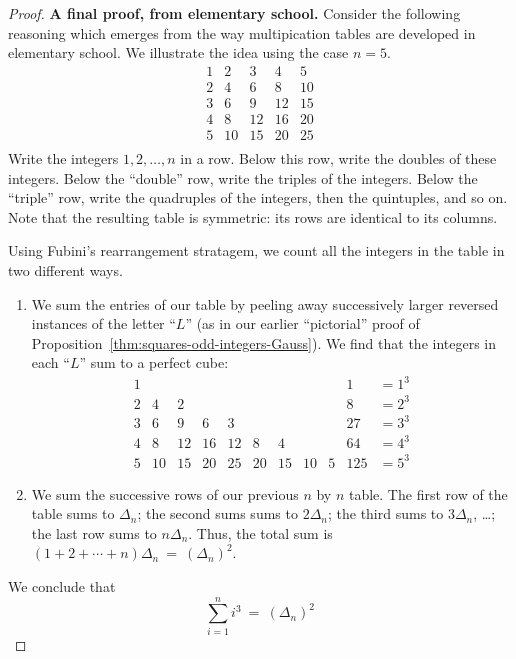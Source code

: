 \begin{proof}
{\bf A final proof, from elementary school.}
%
Consider the following reasoning which emerges from the way
multipication tables are developed in elementary school.  We
illustrate the idea using the case $n=5$.
\[
\begin{array}{rrrrr}
1  &  2 &  3 &  4 &  5 \\
2  &  4 &  6 &  8 & 10 \\
3  &  6 &  9 & 12 & 15 \\
4  &  8 & 12 & 16 & 20 \\
5  & 10 & 15 & 20 & 25 \\
\end{array}
\]
Write the integers $1, 2, \ldots, n$ in a row.  Below this row, write
the doubles of these integers.  Below the ``double'' row, write the
triples of the integers.  Below the ``triple'' row, write the
quadruples of the integers, then the quintuples, and so on.  Note that
the resulting table is symmetric: its rows are identical to its
columns.

Using Fubini's rearrangement stratagem, we count all the integers in
the table in two different ways.
\begin{enumerate}
\item
We sum the entries of our table by peeling away successively larger
reversed instances of the letter ``$L$'' (as in our earlier
``pictorial'' proof of
Proposition~\ref{thm:squares-odd-integers-Gauss}).  We find that the
integers in each ``$L$'' sum to a perfect cube:
\[
\begin{array}{ccccccccc|cl}
1  &    &    &    &    &   &     &    &   & 1   & = 1^3 \\
2  &  4 &  2 &    &    &   &     &    &   & 8   & = 2^3 \\
3  &  6 &  9 &  6 &  3 &   &     &    &   & 27  & = 3^3 \\
4  &  8 & 12 & 16 & 12 &  8 &  4 &    &   & 64  & = 4^3 \\
5  & 10 & 15 & 20 & 25 & 20 & 15 & 10 & 5 & 125 & = 5^3
\end{array}
\]

\item
We sum the successive rows of our previous $n$ by $n$ table.  The
first row of the table sums to $\Delta_n$; the second sums sums to $2
\Delta_n$; the third sums to $3 \Delta_n$, \ldots; the last row sums
to $n \Delta_n$.  Thus, the total sum is $(1 + 2 + \cdots + n)
\Delta_n \ = \ \left(\Delta_n \right)^2$.
\end{enumerate}
We conclude that
\[
\sum_{i=1}^n i^3 \ = \  \left(\Delta_n \right)^2
\]
\end{proof}

